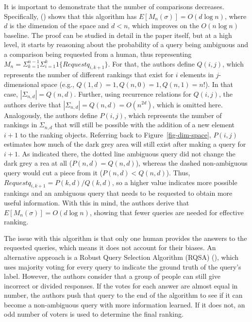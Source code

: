 \documentclass[
  letterpaper,
  numbers=noenddot,
  DIV=11]{scrreprt}
\theoremstyle{plain}
\theoremstyle{definition}
\theoremstyle{plain}
\theoremstyle{remark}
\begin{document}
It is important to demonstrate that the number of comparisons decreases.
Specifically, () shows that
this algorithm has \(E[M_n(\sigma)] = O(d\log n)\), where \(d\) is the
dimension of the space and \(d < n\), which improves on the
\(O(n\log n)\) baseline. The proof can be studied in detail in the paper
itself, but at a high level, it starts by reasoning about the
probability of a query being ambiguous and a comparison being requested
from a human, thus representing
\(M_n = \Sigma_{k=1}^{n-1}\Sigma_{i=1}^k 1\{Requestq_{i,k+1}\}\). For
that, the authors define \(Q(i,j)\), which represents the number of
different rankings that exist for \(i\) elements in \(j\)-dimensional
space (e.g., \(Q(1,d) = 1, Q(n,0) = 1, Q(n,1) = n!\)). In that case,
\(|\Sigma_{n,d}| = Q(n,d)\). Further, using recurrence relations for
\(Q(i,j)\), the authors derive that
\(|\Sigma_{n,d}| = Q(n,d) = O(n^{2d})\), which is omitted here.
Analogously, the authors define \(P(i,j)\), which represents the number
of rankings in \(\Sigma_{n,d}\) that will still be possible with the
addition of a new element \(i+1\) to the ranking objects. Referring back
to Figure~\ref{fig-dim-space}, \(P(i,j)\) estimates how much of the dark
grey area will still exist after making a query for \(i+1\). As
indicated there, the dotted line ambiguous query did not change the dark
grey a rea at all (\(P(n,d) = Q(n,d)\)), whereas the dashed
non-ambiguous query would cut a piece from it (\(P(n,d) < Q(n,d)\)).
Thus, \(Request q_{i,k+1} = P(k,d) / Q(k,d)\), so a higher value
indicates more possible rankings and an ambiguous query that needs to be
requested to obtain more useful information. With this in mind, the
authors derive that \(E[M_n(\sigma)] = O(d\log n)\), showing that fewer
queries are needed for effective ranking.

The issue with this algorithm is that only one human provides the
answers to the requested queries, which means it does not account for
their biases. An alternative approach is a Robust Query Selection
Algorithm (RQSA) (), which
uses majority voting for every query to indicate the ground truth of the
query's label. However, the authors consider that a group of people can
still give incorrect or divided responses. If the votes for each answer
are almost equal in number, the authors push that query to the end of
the algorithm to see if it can become a non-ambiguous query with more
information learned. If it does not, an odd number of voters is used to
determine the final ranking.
\end{document}
